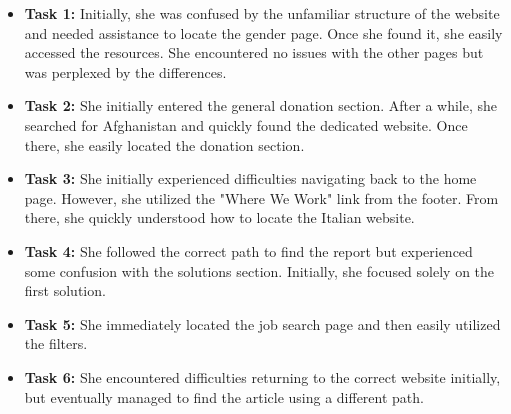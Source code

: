 \begin{itemize}
    \item \textbf{Task 1:} Initially, she was confused by the unfamiliar structure of the website and needed assistance to locate the gender page. Once she found it, she easily accessed the resources. She encountered no issues with the other pages but was perplexed by the differences.
    \item \textbf{Task 2:} She initially entered the general donation section. After a while, she searched for Afghanistan and quickly found the dedicated website. Once there, she easily located the donation section.
    \item \textbf{Task 3:} She initially experienced difficulties navigating back to the home page. However, she utilized the "Where We Work" link from the footer. From there, she quickly understood how to locate the Italian website.
    \item \textbf{Task 4:} She followed the correct path to find the report but experienced some confusion with the solutions section. Initially, she focused solely on the first solution.
    \item \textbf{Task 5:} She immediately located the job search page and then easily utilized the filters.
    \item \textbf{Task 6:} She encountered difficulties returning to the correct website initially, but eventually managed to find the article using a different path.
\end{itemize}





\vspace{1cm}

